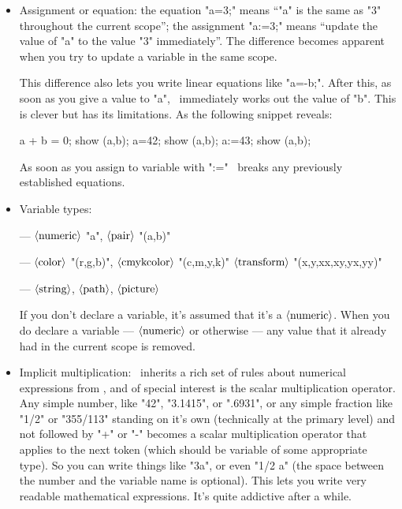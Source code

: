 \documentclass[a4paper,landscape]{article}
\def\mwpic#1#2{\vadjust{\moveright5.5in\vbox to 0pt{\hsize4in\vskip#1\centerline{\texttt{[image: \#2]}}\vss}}}
\def\<#1>{\ensuremath{\langle\hbox{#1}\rangle}}
\begin{document}
\begin{itemize}
    \item Assignment or equation:  the equation "a=3;" means “"a" is the same as "3" throughout the
        current scope”; the assignment "a:=3;" means “update the value of "a" to the value "3"
        immediately”.  The difference becomes apparent when you try to update a
        variable in the same scope.
        \mwpic{-64pt}{tiling-arch-hexagon}

        This difference also lets you write linear equations
        like "a=-b;".  After this, as soon as you give  a value to "a", \MP\ immediately works
        out the value of "b".
        This is clever but has its limitations.  As the following snippet reveals:
\begin{code}
  a + b = 0; show (a,b);  %
  a=42;      show (a,b);  %
  a:=43;     show (a,b);  %
\end{code}
        As soon as you assign to variable with ":=" \MP\ breaks any previously
        established equations.

    \item Variable types:

        —
        \<numeric> "a",
        \<pair> "(a,b)"

        —
        \<color> "(r,g,b)",
        \<cmykcolor> "(c,m,y,k)"
        \<transform> "(x,y,xx,xy,yx,yy)"

        —
        \<string>,
        \<path>,
        \<picture>


        If you don’t declare a variable, it’s assumed that it’s a \<numeric>.
        When you do declare a variable --- \<numeric> or otherwise — any value that it
       already had in the current scope is removed.

    \item Implicit multiplication: \MP\ inherits a rich set of rules about numerical
        expressions from \MF, and of special interest is the scalar multiplication
        operator.  Any simple number, like "42", "3.1415", or ".6931", or any simple
        fraction like "1/2" or "355/113" standing on it’s own (technically at the
        primary level) and not followed by "+" or "-" becomes a scalar
        multiplication operator that applies to the next token (which should be variable
        of some appropriate type).
        So you can write things like "3a", or even "1/2 a"
        (the space between the number and the variable name is optional). This
        lets you write very readable mathematical expressions. It’s quite
        addictive after a while.

\end{itemize}
\end{document}
